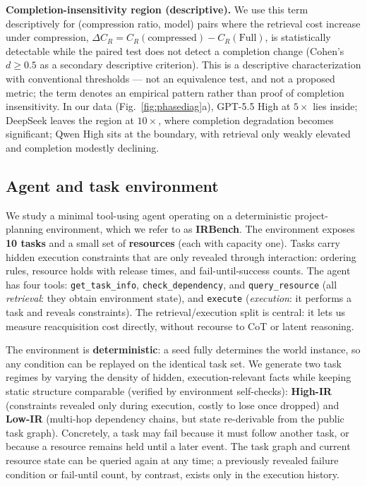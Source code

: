 \documentclass[11pt]{article}
\begin{document}
\textbf{Completion-insensitivity region (descriptive).} We use this term descriptively for
(compression ratio, model) pairs where the retrieval cost increase under compression,
$\Delta C_R = C_R(\text{compressed}) - C_R(\text{Full})$, is statistically detectable while the paired test does
not detect a completion change (Cohen's $d \ge 0.5$ as a secondary descriptive criterion).
This is a descriptive characterization with conventional thresholds --- not an equivalence
test, and not a proposed metric; the term denotes an empirical pattern rather than proof of
completion insensitivity. In our data (Fig.~\ref{fig:phasediag}a), GPT-5.5 High at $5\times$ lies inside;
DeepSeek leaves the region at $10\times$, where completion degradation becomes significant; Qwen
High sits at the boundary, with retrieval only weakly elevated and completion modestly
declining.

\subsection{Agent and task environment}
\label{sec:env}

We study a minimal tool-using agent operating on a deterministic project-planning
environment, which we refer to as \textbf{IRBench}. The environment exposes \textbf{10 tasks} and a small set of \textbf{resources} (each
with capacity one). Tasks carry hidden execution constraints that are only revealed
through interaction: ordering rules, resource holds with release times, and
fail-until-success counts. The agent has four tools: \texttt{get\_task\_info}, \texttt{check\_dependency},
and \texttt{query\_resource} (all \emph{retrieval}: they obtain environment state), and \texttt{execute}
(\emph{execution}: it performs a task and reveals constraints). The retrieval/execution split
is central: it lets us measure reacquisition cost directly, without recourse to CoT or
latent reasoning.

The environment is \textbf{deterministic}: a seed fully determines the world instance, so any
condition can be replayed on the identical task set. We generate two task regimes by
varying the density of hidden, execution-relevant facts while keeping static structure
comparable (verified by environment self-checks): \textbf{High-IR} (constraints revealed only
during execution, costly to lose once dropped) and \textbf{Low-IR} (multi-hop dependency
chains, but state re-derivable from the public task graph). Concretely, a task may fail
because it must follow another task, or because a resource remains held until a later
event. The task graph and current resource state can be queried again at any time; a
previously revealed failure condition or fail-until count, by contrast, exists only in
the execution history.
\end{document}

